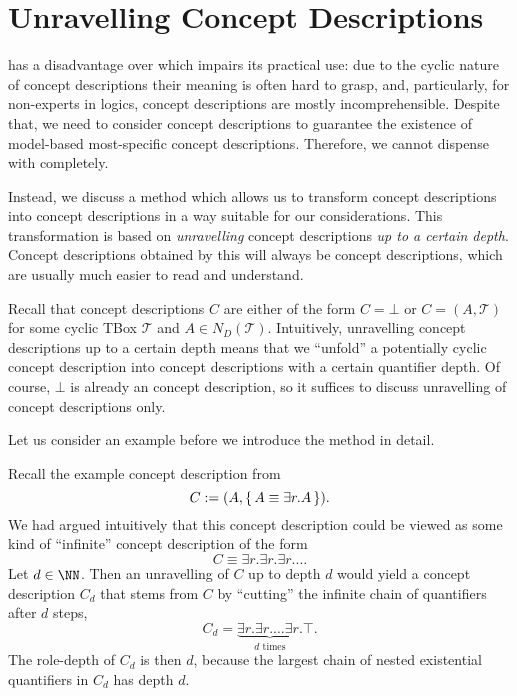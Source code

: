 \section{Unravelling \ELgfpbot Concept Descriptions}
\label{sec:unrav-elgfpb-conc}

\ELgfpbot has a disadvantage over \ELbot which impairs its practical use: due to the
cyclic nature of \ELgfpbot concept descriptions their meaning is often hard to grasp, and,
particularly, for non-experts in logics, \ELgfpbot concept descriptions are mostly
incomprehensible.  Despite that, we need to consider \ELgfpbot concept descriptions to
guarantee the existence of model-based most-specific concept descriptions.  Therefore, we
cannot dispense with \ELgfpbot completely.

Instead, we discuss a method which allows us to transform \ELgfpbot concept descriptions
into \ELbot concept descriptions in a way suitable for our considerations.  This
transformation is based on \emph{unravelling} \ELgfpbot concept descriptions \emph{up to a
  certain depth}.  Concept descriptions obtained by this will always be \ELbot concept
descriptions, which are usually much easier to read and understand.

Recall that \ELgfpbot concept descriptions $C$ are either of the form $C = \bot$ or $C =
(A, \mathcal{T})$ for some cyclic TBox $\mathcal{T}$ and $A \in N_D(\mathcal{T})$.
Intuitively, unravelling \ELgfpbot concept descriptions up to a certain depth means that
we ``unfold'' a potentially cyclic \ELgfpbot concept description into \ELbot concept
descriptions with a certain quantifier depth.  Of course, $\bot$ is already an \ELbot
concept description, so it suffices to discuss unravelling of \ELgfp concept descriptions
only.

Let us consider an example before we introduce the method in detail.

\begin{Example}
  \label{expl:unravelling}
  Recall the example concept description from 
  \begin{equation*}
    C := (A, {\{\, A \equiv \exists r. A \,\}}).
  \end{equation*}
  We had argued intuitively that this concept description could be viewed as some kind of
  ``infinite'' \ELbot concept description of the form
  \begin{equation*}
    C \equiv \exists r. \exists r. \exists r. \dots
  \end{equation*}
  Let $d \in \NN$.  Then an unravelling of $C$ up to depth $d$ would yield a concept
  description $C_d$ that stems from $C$ by ``cutting'' the infinite chain of quantifiers
  after $d$ steps, \ie
  \begin{equation*}
    C_d = \underbrace{\exists r. \exists r. \dots \exists r.}_{d \text{ times}} \top.
  \end{equation*}
  The role-depth of $C_d$ is then $d$, because the largest chain of nested existential
  quantifiers in $C_d$ has depth $d$.
\end{Example}

